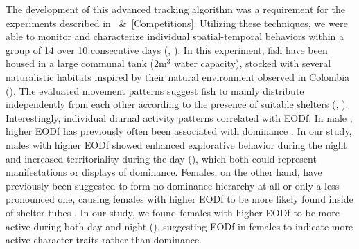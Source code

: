 The development of this advanced tracking algorithm was a requirement for the experiments described in ~\&~\ref{Competitions}. Utilizing these techniques, we were able to monitor and characterize individual spatial-temporal behaviors within a group of 14 \lepto{} over 10 consecutive days (, \citealp{Raab2019}). In this experiment, fish have been housed in a large communal tank (2m$^3$ water capacity), stocked with several naturalistic habitats inspired by their natural environment observed in Colombia (). The evaluated movement patterns suggest fish to mainly distribute independently from each other according to the presence of suitable shelters (, ). Interestingly, individual diurnal activity patterns correlated with EODf. In male \lepto{}, higher EODf has previously often been associated with dominance \citep{Hagedorn1985, Dunlap2002, Triefenbach2008}. In our study, males with higher EODf showed enhanced explorative behavior during the night and increased territoriality during the day (), which both could represent manifestations or displays of dominance. Females, on the other hand, have previously been suggested to form no dominance hierarchy at all \citep{Hagedorn1985} or only a less pronounced one, causing females with higher EODf to be more likely found inside of shelter-tubes \citep{Dunlap2002}. In our study, we found females with higher EODf to be more active during both day and night (), suggesting EODf in females to indicate more active character traits rather than dominance. 


